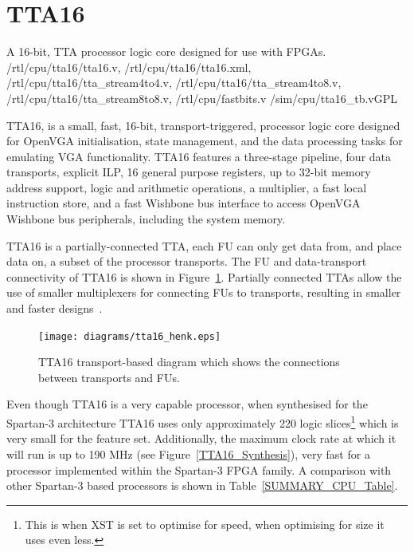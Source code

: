 \section{TTA16}
\label{TTA16}

{A 16-bit, TTA processor logic core designed for use with FPGAs.}
{/rtl/cpu/tta16/tta16.v, /rtl/cpu/tta16/tta16.xml,
/rtl/cpu/tta16/tta\_stream4to4.v, /rtl/cpu/tta16/tta\_stream4to8.v,
/rtl/cpu/tta16/tta\_stream8to8.v, /rtl/cpu/fastbits.v}
{/sim/cpu/tta16\_tb.v}{GPL}

TTA16, is a small, fast, 16-bit, transport-triggered, processor logic core
designed for OpenVGA initialisation, state management, and the data processing
tasks for emulating VGA functionality. TTA16 features a three-stage pipeline,
four data transports, explicit ILP, 16 general purpose registers, up to 32-bit
memory address support, logic and arithmetic operations, a multiplier, a fast
local instruction store, and a fast Wishbone bus interface to access OpenVGA
Wishbone bus peripherals, including the system memory.

TTA16 is a partially-connected TTA, each FU can only get data from, and place
data on, a subset of the processor transports. The FU and data-transport
connectivity of TTA16 is shown in Figure~\ref{TTA16_Tranport_View}. Partially
connected TTAs allow the use of smaller multiplexers for connecting FUs to
transports, resulting in smaller and faster designs~\cite{arnold1997dtr}.

\begin{figure}[h!]
\begin{center}
\texttt{[image: diagrams/tta16\_henk.eps]}
\caption[TTA16 transports and functional units overview]{TTA16 transport-based
diagram which shows the connections between transports and FUs.}
\end{center}
\label{TTA16_Tranport_View}
\end{figure}

Even though TTA16 is a very capable processor, when synthesised for the Spartan-3
architecture TTA16 uses only approximately 220 logic slices\footnote{This is when
XST is set to optimise for speed, when optimising for size it uses even less.}
which is very small for the feature set. Additionally, the maximum clock rate at
which it will run is up to 190 MHz (see Figure~\ref{TTA16_Synthesis}), very fast
for a processor implemented within the Spartan-3 FPGA family. A comparison with
other Spartan-3 based processors is shown in Table~\ref{SUMMARY_CPU_Table}.


